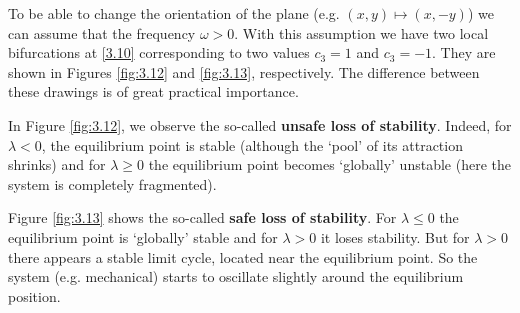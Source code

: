 \begin{remark}
	To be able to change the orientation of the plane (e.g. $(x,y)\longmapsto (x,-y)$) we can assume that the frequency $\omega >0$. With this assumption we have two local bifurcations at \eqref{3.10} corresponding to two values $c_3 = 1$ and $c_3 = -1$. They are shown in Figures \ref{fig:3.12} and \ref{fig:3.13}, respectively. The difference between these drawings is of great practical importance.
	
	In Figure \ref{fig:3.12}, we observe the so-called \textbf{unsafe loss of stability}. Indeed, for $\lambda <0$, the equilibrium point is stable (although the `pool' of its attraction shrinks) and for $\lambda \geq 0$ the equilibrium point becomes `globally' unstable (here the system is completely fragmented).
	
	Figure \ref{fig:3.13} shows the so-called \textbf{safe loss of stability}. For $\lambda \leq 0$ the equilibrium point is `globally' stable and for $\lambda >0$ it loses stability. But for $\lambda >0$ there appears a stable limit cycle, located near the equilibrium point. So the system (e.g. mechanical) starts to oscillate slightly around the equilibrium position.
\end{remark}

